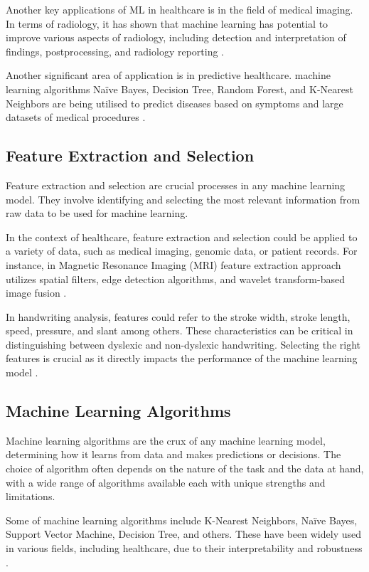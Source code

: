 Another key applications of ML in healthcare is in the field of medical imaging. In terms of radiology, it has shown that machine learning has potential to improve various aspects of radiology, including detection and interpretation of findings, postprocessing, and radiology reporting \parencite{Choy2018, Erickson2017}.

Another significant area of application is in predictive healthcare. machine learning algorithms Naïve Bayes, Decision Tree, Random Forest, and K-Nearest Neighbors are being utilised to predict diseases based on symptoms and large datasets of medical procedures \parencite{Garg2023}.

\newpage
\subsection{Feature Extraction and Selection}
Feature extraction and selection are crucial processes in any machine learning model. They involve identifying and selecting the most relevant information from raw data to be used for machine learning.

In the context of healthcare, feature extraction and selection could be applied to a variety of data, such as medical imaging, genomic data, or patient records. For instance, in Magnetic Resonance Imaging (MRI) feature extraction approach utilizes spatial filters, edge detection algorithms, and wavelet transform-based image fusion \parencite{Udomhunsakul}.

In handwriting analysis, features could refer to the stroke width, stroke length, speed, pressure, and slant among others. These characteristics can be critical in distinguishing between dyslexic and non-dyslexic handwriting. Selecting the right features is crucial as it directly impacts the performance of the machine learning model \parencite{Arif2015}.

\newpage
\subsection{Machine Learning Algorithms}
Machine learning algorithms are the crux of any machine learning model, determining how it learns from data and makes predictions or decisions. The choice of algorithm often depends on the nature of the task and the data at hand, with a wide range of algorithms available each with unique strengths and limitations.

Some of machine learning algorithms include K-Nearest Neighbors, Naïve Bayes, Support Vector Machine, Decision Tree, and others. These have been widely used in various fields, including healthcare, due to their interpretability and robustness \parencite{Ray2019}.

